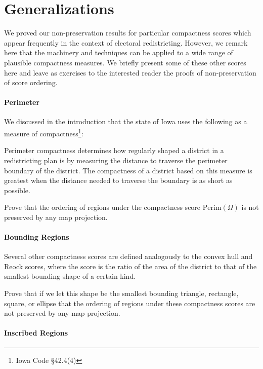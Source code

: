 \section{Generalizations}
\label{sec:generalz}
We proved our non-preservation results for particular compactness scores which appear frequently in the context of electoral redistricting.  However, we remark here that the machinery and techniques can be applied to a wide range of plausible compactness measures.  We briefly present some of these other scores here and leave as exercises to the interested reader the proofs of non-preservation of score ordering.

\paragraph{Perimeter} 

We discussed in the introduction that the state of Iowa uses the following as a measure of compactness\footnote{Iowa Code \S42.4(4)}:

\begin{displayquote}
	
	Perimeter compactness determines how regularly shaped a district in a
	redistricting plan is by measuring the distance to traverse the perimeter boundary of
	the district. The compactness of a district based on this measure is greatest when
	the distance needed to traverse the boundary is as short as possible. 
	
	\end{displayquote}

Prove that the ordering of regions  under the compactness score $\mathrm{Perim}(\Omega)$ is not preserved by any map projection.




\paragraph{Bounding Regions}

Several other compactness scores are defined analogously to the convex hull and Reock scores, where the score is the ratio of the area of the district to that of the smallest bounding shape of a certain kind.

Prove that if we let this shape be the smallest bounding triangle, rectangle, square, or ellipse that the ordering of regions under these compactness scores are not preserved by any map projection.

\paragraph{Inscribed Regions}


